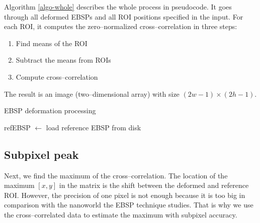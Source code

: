 Algorithm \ref{algo-whole} describes the whole process in pseudocode. It goes through all deformed EBSPs and all ROI positions specified in the input. For each ROI, it computes the zero--normalized cross--corre\-lation in three steps:
\begin{enumerate}
	\item Find means of the ROI
	\item Subtract the means from ROIs
	\item Compute cross--correlation
\end{enumerate}
The result is an image (two--dimensional array) with size $(2w-1) \times (2h-1)$.

\begin{algorithm}
	\caption{EBSP deformation processing}
	\label{algo-whole}
	\vspace{5px}
	
	refEBSP  $\leftarrow$ load reference EBSP from disk\;
	
\end{algorithm}

\subsection{Subpixel peak}

Next, we find the maximum of the cross--correlation. The location of the maximum $[x,y]$ in the matrix is the shift between the deformed and reference ROI. However, the precision of one pixel is not enough because it is too big in comparison with the nanoworld the EBSP technique studies. That is why we use the cross--correlated data to estimate the maximum with subpixel accuracy.

